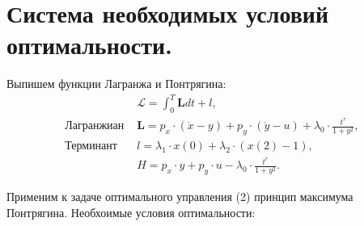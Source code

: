 \documentclass[a4paper,12pt]{article}
\begin{document}
\section{Система необходимых условий оптимальности.}
Выпишем функции Лагранжа и Понтрягина: 
\begin{align*}
&\mathcal{L}=\int_{0}^{T}\mathbf{L}dt + l,\\
\textrm{ Лагранжиан  } &\mathbf{L}=p_x \cdot (\dot x -y)+p_y \cdot (\dot y -u)+\lambda_0 \cdot \frac{t^r}{1+y^2},\\
\textrm{ Терминант  } &l=\lambda_1 \cdot x(0)+ \lambda_2 \cdot (x(2)-1),\\
&H=p_x \cdot y + p_y \cdot u- \lambda_0 \cdot \frac{t^r}{1+y^2}.
\end{align*}

Применим к задаче оптимального управления (2) принцип максимума Понтрягина. Необхоимые условия оптимальности:
\end{document}
